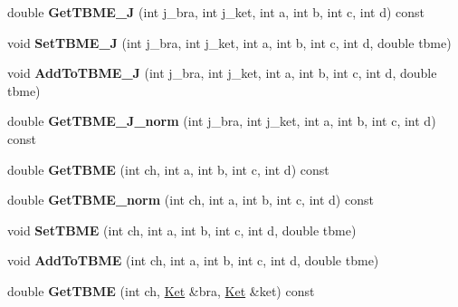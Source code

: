 \begin{DoxyCompactItemize}
\item 
\mbox{\label{classTwoBodyME_a385455012cf6f22fb94a218c70ce25e8}} 
double {\bfseries Get\+T\+B\+M\+E\+\_\+J} (int j\+\_\+bra, int j\+\_\+ket, int a, int b, int c, int d) const
\item 
\mbox{\label{classTwoBodyME_a5f3f5cff3f7908b53d280a3e3c6d335c}} 
void {\bfseries Set\+T\+B\+M\+E\+\_\+J} (int j\+\_\+bra, int j\+\_\+ket, int a, int b, int c, int d, double tbme)
\item 
\mbox{\label{classTwoBodyME_a99e7650830fdc19a7d7fef5d0be8d7f2}} 
void {\bfseries Add\+To\+T\+B\+M\+E\+\_\+J} (int j\+\_\+bra, int j\+\_\+ket, int a, int b, int c, int d, double tbme)
\item 
\mbox{\label{classTwoBodyME_ab5df6a8eca64b0e88ebcff3b1a1d04e3}} 
double {\bfseries Get\+T\+B\+M\+E\+\_\+\+J\+\_\+norm} (int j\+\_\+bra, int j\+\_\+ket, int a, int b, int c, int d) const
\item 
\mbox{\label{classTwoBodyME_a04aa5b2c179869ec42d8b7b554db58bd}} 
double {\bfseries Get\+T\+B\+ME} (int ch, int a, int b, int c, int d) const
\item 
\mbox{\label{classTwoBodyME_a722a433a9f256ea269e6c827f185926b}} 
double {\bfseries Get\+T\+B\+M\+E\+\_\+norm} (int ch, int a, int b, int c, int d) const
\item 
\mbox{\label{classTwoBodyME_a255f61e91a2cee85cd34714bc5132221}} 
void {\bfseries Set\+T\+B\+ME} (int ch, int a, int b, int c, int d, double tbme)
\item 
\mbox{\label{classTwoBodyME_a202536f8f9cb8c74f1976d9bbafdaaf8}} 
void {\bfseries Add\+To\+T\+B\+ME} (int ch, int a, int b, int c, int d, double tbme)
\item 
\mbox{\label{classTwoBodyME_aae40b7e6005d6afe4ed69a7ff8a201cb}} 
double {\bfseries Get\+T\+B\+ME} (int ch, \hyperlink{classKet}{Ket} \&bra, \hyperlink{classKet}{Ket} \&ket) const
\item 
\mbox{\label{classTwoBodyME_a57db036e0c5c13219339d9e6b775a3c0}} 

\end{DoxyCompactItemize}
